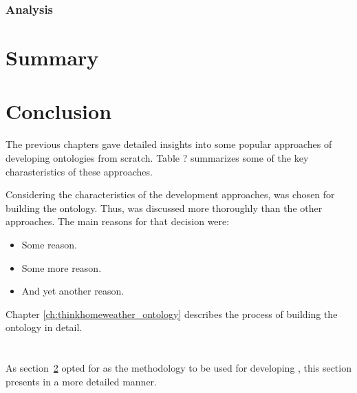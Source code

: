\subsubsection{Analysis}



\section{Summary}
\label{sec:approaches_summary}

\section{Conclusion}
\label{sec:approaches_conclusion}

The previous chapters gave detailed insights into some popular approaches of developing ontologies from scratch. Table ? summarizes some of the key charasteristics of these approaches.


Considering the characteristics of the development approaches, \methontology was chosen for building the \thinkhomeweather ontology. Thus, \methontology was discussed more thoroughly than the other approaches. The main reasons for that decision were:

\begin{itemize}
  \item Some reason.
  \item Some more reason.
  \item And yet another reason.
\end{itemize}

Chapter \ref{ch:thinkhomeweather_ontology} describes the process of building the \thinkhomeweather ontology in detail.

\section{\methontology}

As section~\ref{sec:approaches_conclusion} opted for \methontology as the methodology to be used for developing \thinkhomeweather, this section presents \methontology in a more detailed manner.

